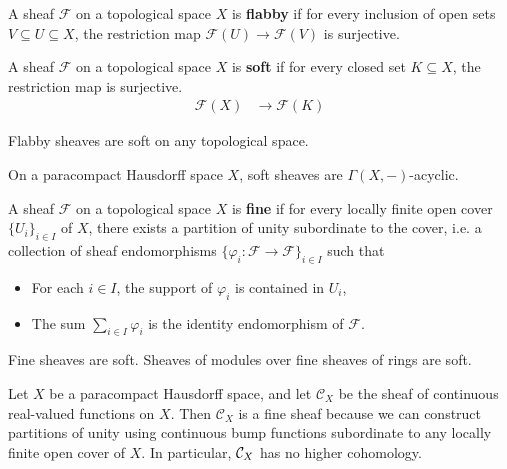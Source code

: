 \documentclass[12pt]{article}
\begin{document}
\begin{definition}
    A sheaf $\mathcal{F}$ on a topological space $X$ is \textbf{flabby} if for every inclusion of open sets $V \subseteq U \subseteq X$, the restriction map $\mathcal{F}(U)\to \mathcal{F}(V)$ is surjective.

\end{definition}
\begin{definition}
    A sheaf $\mathcal{F}$ on a topological space $X$ is \textbf{soft} if for every closed set $K \subseteq X$, the restriction map is surjective. \begin{align*}
        \mathcal{F}(X) & \to \mathcal{F}(K)
    \end{align*}
\end{definition}

\begin{proposition}
    Flabby sheaves are soft on any topological space.
\end{proposition}


\begin{theorem}
    On a paracompact Hausdorff space $X$, soft sheaves are $\Gamma(X, -)$-acyclic.
\end{theorem}

\begin{definition}
    A sheaf $\mathcal{F}$ on a topological space $X$ is \textbf{fine} if for every locally finite open cover $\{U_i\}_{i \in I}$ of $X$, there exists a partition of unity subordinate to the cover, i.e. a collection of sheaf endomorphisms $\{\varphi_i: \mathcal{F} \to \mathcal{F}\}_{i \in I}$ such that
    \begin{itemize}
        \item For each $i \in I$, the support of $\varphi_i$ is contained in $U_i$,
        \item The sum $\sum_{i \in I} \varphi_i$ is the identity endomorphism of $\mathcal{F}$.
    \end{itemize}
\end{definition}

\begin{theorem}
    Fine sheaves are soft. Sheaves of modules over fine sheaves of rings are soft.
\end{theorem}

\begin{example}
    Let $X$ be a paracompact Hausdorff space, and let $\mathcal{C}_X$ be the sheaf of continuous real-valued functions on $X$. Then $\mathcal{C}_X$ is a fine sheaf because we can construct partitions of unity using continuous bump functions subordinate to any locally finite open cover of $X$. In particular, ${\mathcal{C}}_X$ has no higher cohomology.
\end{example}
\end{document}

